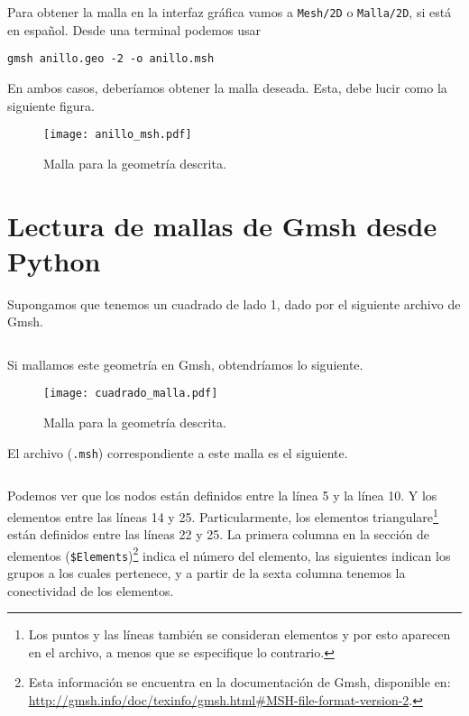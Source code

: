 \inputminted[mathescape,
numbersep=5pt,
gobble=0,
frame=lines,
framesep=2mm]{c}{img/discret/anillo.geo}

Para obtener la malla en la interfaz gráfica vamos a \texttt{Mesh/2D} o \texttt{Malla/2D}, si está en español. Desde una terminal podemos usar

\begin{verbatim}
gmsh anillo.geo -2 -o anillo.msh
\end{verbatim}

En ambos casos, deberíamos obtener la malla deseada. Esta, debe lucir como la siguiente figura.
\begin{figure}[H]
    \centering
    \texttt{[image: anillo\_msh.pdf]}
    \caption{Malla para la geometría descrita.}
    \label{fig:malla}
\end{figure}


\section{Lectura de mallas de Gmsh desde Python}
Supongamos que tenemos un cuadrado de lado 1, dado por el siguiente archivo de Gmsh.
\inputminted[mathescape,
numbersep=5pt,
gobble=0,
frame=lines,
framesep=2mm]{c}{img/discret/cuadrado.geo}

Si mallamos este geometría en Gmsh, obtendríamos lo siguiente.
\begin{figure}[H]
    \centering
    \texttt{[image: cuadrado\_malla.pdf]}
    \caption{Malla para la geometría descrita.}
    \label{fig:malla_cuadrado}
\end{figure}

El archivo (\texttt{.msh}) correspondiente a este malla es el siguiente.
\inputminted[mathescape,
numbersep=5pt,
gobble=0,
frame=lines,
linenos,
framesep=2mm]{bash}{img/discret/cuadrado.msh}

Podemos ver que los nodos están definidos entre la línea 5 y la línea 10. Y los 
elementos entre las líneas 14 y 25. Particularmente, los elementos 
triangulare\footnote{Los puntos y las líneas también se consideran elementos y 
por esto aparecen en el archivo, a menos que se especifique lo contrario.} 
están definidos entre las líneas 22 y 25. La primera columna en la sección de 
elementos (\texttt{\$Elements})\footnote{Esta información se encuentra en la 
documentación de Gmsh, disponible en: 
\url{http://gmsh.info/doc/texinfo/gmsh.html\#MSH-file-format-version-2}.} 
indica 
el número del elemento, las siguientes indican los grupos a los cuales 
pertenece, y a partir de la sexta columna tenemos la conectividad de los 
elementos.

